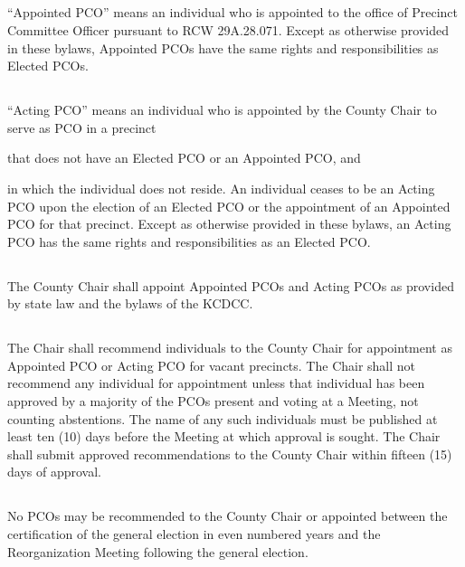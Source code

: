 \documentclass{article}
\begin{document}
\subsection{}
“Appointed PCO” means an individual who is appointed to the office of Precinct Committee Officer pursuant to RCW 29A.28.071. Except as otherwise provided in these bylaws, Appointed PCOs have the same rights and responsibilities as Elected PCOs.

\subsection{}
“Acting PCO” means an individual who is appointed by the County Chair to serve as PCO in a precinct
\begin{inlinealphalist}
    \item that does not have an Elected PCO or an Appointed PCO, and
    \item in which the individual does not reside. An individual ceases to be an Acting PCO upon the election of an Elected PCO or the appointment of an Appointed PCO for that precinct. Except as otherwise provided in these bylaws, an Acting PCO has the same rights and responsibilities as an Elected PCO.
\end{inlinealphalist}

\subsection{}
The County Chair shall appoint Appointed PCOs and Acting PCOs as provided by state law and the bylaws of the KCDCC.

\subsection{}
The Chair shall recommend individuals to the County Chair for appointment as Appointed PCO or Acting PCO for vacant precincts. The Chair shall not recommend any individual for appointment unless that individual has been approved by a majority of the PCOs present and voting at a Meeting, not counting abstentions. The name of any such individuals must be published at least ten (10) days before the Meeting at which approval is sought. The Chair shall submit approved recommendations to the County Chair within fifteen (15) days of approval.

\subsection{}
No PCOs may be recommended to the County Chair or appointed between the certification of the general election in even numbered years and the Reorganization Meeting following the general election.
\end{document}
